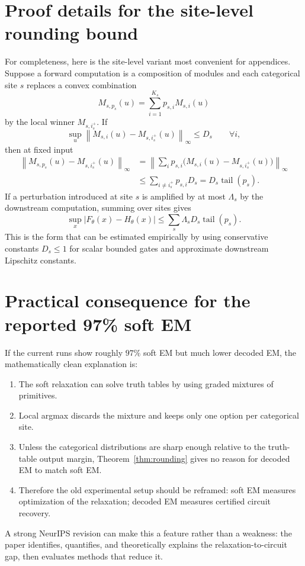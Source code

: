 \documentclass[11pt]{article}
\theoremstyle{definition}
\theoremstyle{remark}
\newcommand{\tail}{\operatorname{tail}}
\newcommand{\norm}[1]{\left\lVert #1\right\rVert}
\begin{document}
\section{Proof details for the site-level rounding bound}

For completeness, here is the site-level variant most convenient for appendices.  Suppose a forward computation is a composition of modules and each categorical site $s$ replaces a convex combination
\[
    M_{s,p_s}(u)=\sum_{i=1}^{K_s}p_{s,i}M_{s,i}(u)
\]
by the local winner $M_{s,i_s^+}$.  If
\[
    \sup_u \norm{M_{s,i}(u)-M_{s,i_s^+}(u)}_\infty\le D_s
    \qquad\forall i,
\]
then at fixed input
\[
\begin{aligned}
\norm{M_{s,p_s}(u)-M_{s,i_s^+}(u)}_\infty
&=\norm{\sum_i p_{s,i}\big(M_{s,i}(u)-M_{s,i_s^+}(u)\big)}_\infty\\
&\le \sum_{i\ne i_s^+}p_{s,i}D_s
= D_s\tail(p_s).
\end{aligned}
\]
If a perturbation introduced at site $s$ is amplified by at most $\Lambda_s$ by the downstream computation, summing over sites gives
\[
    \sup_x|F_\theta(x)-H_\theta(x)|
    \le
    \sum_s \Lambda_sD_s\tail(p_s).
\]
This is the form that can be estimated empirically by using conservative constants $D_s\le1$ for scalar bounded gates and approximate downstream Lipschitz constants.

\section{Practical consequence for the reported 97\% soft EM}

If the current runs show roughly $97\%$ soft EM but much lower decoded EM, the mathematically clean explanation is:
\begin{enumerate}[leftmargin=1.4em]
\item The soft relaxation can solve truth tables by using graded mixtures of primitives.
\item Local argmax discards the mixture and keeps only one option per categorical site.
\item Unless the categorical distributions are sharp enough relative to the truth-table output margin, Theorem~\ref{thm:rounding} gives no reason for decoded EM to match soft EM.
\item Therefore the old experimental setup should be reframed: soft EM measures optimization of the relaxation; decoded EM measures certified circuit recovery.
\end{enumerate}

A strong NeurIPS revision can make this a feature rather than a weakness: the paper identifies, quantifies, and theoretically explains the relaxation-to-circuit gap, then evaluates methods that reduce it.
\end{document}
